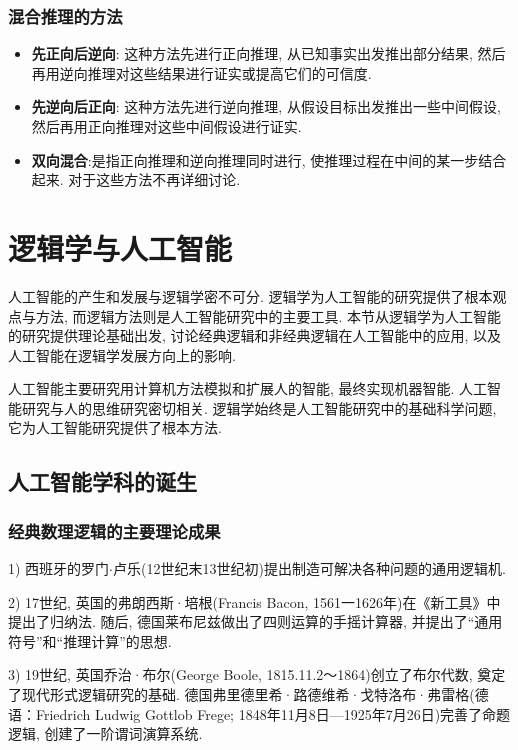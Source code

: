 \subsubsection{混合推理的方法}
\begin{itemize}
\item \textbf{先正向后逆向}: 这种方法先进行正向推理, 从已知事实出发推出部分结果, 然后再用逆向推理对这些结果进行证实或提高它们的可信度.
\item \textbf{先逆向后正向}: 这种方法先进行逆向推理, 从假设目标出发推出一些中间假设, 然后再用正向推理对这些中间假设进行证实.
\item \textbf{双向混合}:是指正向推理和逆向推理同时进行, 使推理过程在中间的某一步结合起来. 对于这些方法不再详细讨论.
\end{itemize}
\section{逻辑学与人工智能}

人工智能的产生和发展与逻辑学密不可分. 逻辑学为人工智能的研究提供了根本观点与方法, 而逻辑方法则是人工智能研究中的主要工具. 本节从逻辑学为人工智能的研究提供理论基础出发, 讨论经典逻辑和非经典逻辑在人工智能中的应用, 以及人工智能在逻辑学发展方向上的影响.

人工智能主要研究用计算机方法模拟和扩展人的智能, 最终实现机器智能. 人工智能研究与人的思维研究密切相关. 逻辑学始终是人工智能研究中的基础科学问题, 它为人工智能研究提供了根本方法.

\subsection{人工智能学科的诞生}
\subsubsection{经典数理逻辑的主要理论成果}
1) 西班牙的罗门$\cdot$卢乐(12世纪末13世纪初)提出制造可解决各种问题的通用逻辑机.

2) 17世纪, 英国的弗朗西斯·培根(Francis Bacon, 1561一1626年)在《新工具》中提出了归纳法. 随后, 德国莱布尼兹做出了四则运算的手摇计算器, 并提出了“通用符号”和“推理计算”的思想.

3) 19世纪, 英国乔治·布尔(George Boole, 1815.11.2～1864)创立了布尔代数, 奠定了现代形式逻辑研究的基础. 德国弗里德里希·路德维希·戈特洛布·弗雷格(德语：Friedrich Ludwig Gottlob Frege; 1848年11月8日—1925年7月26日)完善了命题逻辑, 创建了一阶谓词演算系统.

